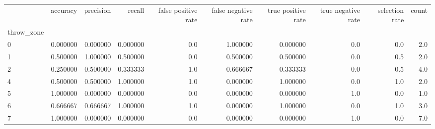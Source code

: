 \begin{tabular}{lrrrrrrrrr}
\toprule
{} &  accuracy &  precision &    recall &  false positive rate &  false negative rate &  true positive rate &  true negative rate &  selection rate &  count \\
throw\_zone &           &            &           &                      &                      &                     &                     &                 &        \\
\midrule
0          &  0.000000 &   0.000000 &  0.000000 &                  0.0 &             1.000000 &            0.000000 &                 0.0 &             0.0 &    2.0 \\
1          &  0.500000 &   1.000000 &  0.500000 &                  0.0 &             0.500000 &            0.500000 &                 0.0 &             0.5 &    2.0 \\
2          &  0.250000 &   0.500000 &  0.333333 &                  1.0 &             0.666667 &            0.333333 &                 0.0 &             0.5 &    4.0 \\
4          &  0.500000 &   0.500000 &  1.000000 &                  1.0 &             0.000000 &            1.000000 &                 0.0 &             1.0 &    2.0 \\
5          &  1.000000 &   0.000000 &  0.000000 &                  0.0 &             0.000000 &            0.000000 &                 1.0 &             0.0 &    1.0 \\
6          &  0.666667 &   0.666667 &  1.000000 &                  1.0 &             0.000000 &            1.000000 &                 0.0 &             1.0 &    3.0 \\
7          &  1.000000 &   0.000000 &  0.000000 &                  0.0 &             0.000000 &            0.000000 &                 1.0 &             0.0 &    7.0 \\
\bottomrule
\end{tabular}
